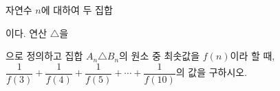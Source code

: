 \hspace*{2mm}\begin{minipage}[t]{\dimexpr\linewidth-2mm\relax}\vspace{0pt}
자연수 $n$에 대하여 두 집합 \par\smallskip{}\par\smallskip\noindent 이다. 연산 $\triangle$을 \par\smallskip{}\par\smallskip\noindent 으로 정의하고 집합 $A_n\triangle B_n$의 원소 중 최솟값을 $f(n)$이라 할 때, $\dfrac{1}{f(3)}+\dfrac{1}{f(4)}+\dfrac{1}{f(5)}+\cdots+\dfrac{1}{f(10)}$의 값을 구하시오.\end{minipage}
